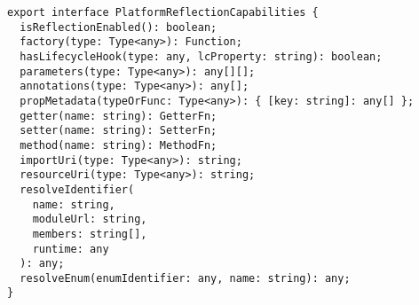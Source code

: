 \begin{verbatim}
export interface PlatformReflectionCapabilities {
  isReflectionEnabled(): boolean;
  factory(type: Type<any>): Function;
  hasLifecycleHook(type: any, lcProperty: string): boolean;
  parameters(type: Type<any>): any[][];
  annotations(type: Type<any>): any[];
  propMetadata(typeOrFunc: Type<any>): { [key: string]: any[] };
  getter(name: string): GetterFn;
  setter(name: string): SetterFn;
  method(name: string): MethodFn;
  importUri(type: Type<any>): string;
  resourceUri(type: Type<any>): string;
  resolveIdentifier(
    name: string,
    moduleUrl: string,
    members: string[],
    runtime: any
  ): any;
  resolveEnum(enumIdentifier: any, name: string): any;
}
\end{verbatim}
